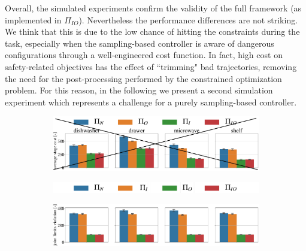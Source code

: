 Overall, the simulated experiments confirm the validity of the full framework (as implemented in $\Pi_{IO}$). Nevertheless the performance differences are not striking. We think that this is due to the low chance of hitting the constraints during the task, especially when the sampling-based controller is aware of dangerous configurations through a well-engineered cost function. In fact, high cost on safety-related objectives has the effect of ``trimming" bad trajectories, removing the need for the post-processing performed by the constrained optimization problem. For this reason, in the following we present a second simulation experiment which represents a challenge for a purely sampling-based controller. 

\begin{figure}[t]
\ifreview
\centering
\hspace*{-0.2cm}
\vspace*{0.15cm}
\begin{subfigure}{1\columnwidth}
    \includegraphics[width=\linewidth]{figures/methods_comparison/average_stage_cost_sout.pdf}
\end{subfigure}%
\hfill
\fi
\begin{subfigure}{1\columnwidth}
    \includegraphics[width=\linewidth]{figures/methods_comparison/legend.pdf}
\end{subfigure}%
\hfill
\hspace*{-0.2cm}
\vspace*{0.1cm}
\begin{subfigure}{\columnwidth}
    \includegraphics[width=\linewidth]{figures/methods_comparison/joint_limits.pdf}
\end{subfigure}%
\hfill
\hspace*{-0.2cm}

\end{figure}
